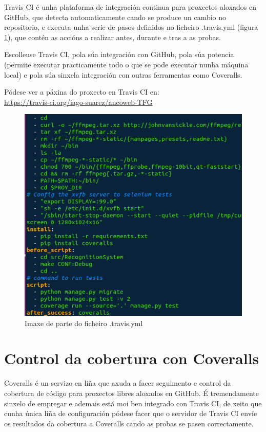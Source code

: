     Travis CI é unha plataforma de integración continua para proxectos aloxados en GitHub, que 
    detecta automaticamente cando se produce un cambio no repositorio, e executa unha serie de pasos 
    definidos no ficheiro .travis.yml (figura \ref{fig:travisYml}), que contén as accións a realizar 
    antes, durante e tras a as probas.
    
    Escolleuse Travis CI, pola súa integración con GitHub, pola súa potencia (permite executar 
    practicamente todo o que se pode executar nunha máquina local) e pola súa sinxela integración
    con outras ferramentas como Coveralls.
    
    Pódese ver a páxina do proxecto en Travis CI en:\\ \url{https://travis-ci.org/iago-suarez/ancoweb-TFG}
    
    \begin{figure}[!htp]
    \begin{center}
        \includegraphics[scale=0.6]{figures/travisYml.png}
        \caption{Imaxe de parte do ficheiro .travis.yml}
    \label{fig:travisYml}
    \end{center}
    \end{figure}
    
    
\section{Control da cobertura con Coveralls}
    Coveralls é un servizo en liña que axuda a facer seguimento e control da cobertura de código para
    proxectos libres aloxados en GitHub. É tremendamente sinxelo de empregar e ademais está moi
    ben integrado con Travis CI, de xeito que cunha única liña de configuración pódese facer que o
    servidor de Travis CI envíe os resultados da cobertura a Coveralls cando as probas se pasen 
    correctamente.
    
